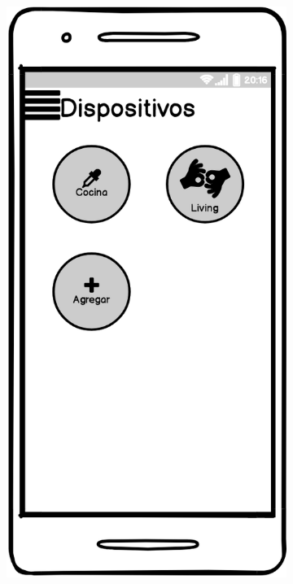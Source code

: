 \begin{figure}[H]
\begin{subfigure}[b]{0.20\textwidth}
    \label{fig:balsamiq}
  \end{subfigure}
  \begin{subfigure}[b]{0.20\textwidth}
    \includegraphics[width=\textwidth, keepaspectratio]{images/balsamiq07}

\end{subfigure}
\end{figure}
